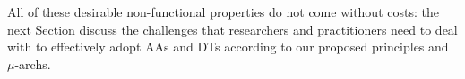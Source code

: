 
All of these desirable non-functional properties do not come without costs: the next Section discuss the challenges that researchers and practitioners need to deal with to effectively adopt AAs and DTs according to our proposed principles and $\mu$-archs. %


